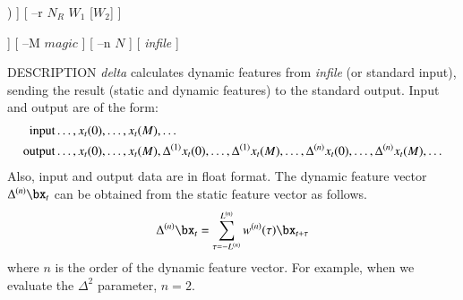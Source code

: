 \begin{synopsis}
	\item [delta] [ --m $M$ ] [ --l $L$ ] [ --t $T$ ] 
		[ --d ($fn$ $|$ $d_0$ [$d_1$ $\dots$]) ]
		[ --r $N_R$ $W_1$ [$W_2$] ]
 \item [\ ~~~~~~~]
 [ --R $N_R$ ${W_F}_{1}$ ${W_B}_{1}$ [${W_F}_{2}$ ${W_B}_{2}$]]
 [ --M $magic$ ] [ --n $N$ ] [ {\em infile} ]
\end{synopsis}

\begin{qsection}{DESCRIPTION}
	{\em delta} calculates dynamic features from {\em infile} (or standard
	input), sending the result (static and dynamic features) to
        the standard output. Input and output are of the form:
    \begin{align}
	\mathrm{input}  & \dots, x_t(0), \dots, x_t(M), \dots \notag \\
	\mathrm{output} & \dots, x_t(0), \dots, x_t(M), \Delta^{(1)} x_t(0), \dots, \Delta^{(1)} x_t(M), \dots,
	\Delta^{(n)} x_t(0), \dots, \Delta^{(n)} x_t(M), \dots \notag
 \end{align}
Also, input and output data are in float format.
The dynamic feature vector $\Delta^{(n)}\bx_t$ can be
obtained from the static feature vector as follows.
 \begin{displaymath}
	\Delta^{(n)}\bx_t 
	= \sum_{\tau=-L^{(n)}}^{L^{(n)}} w^{(n)}(\tau)\bx_{t+\tau}
 \end{displaymath}
where $n$ is the order of the dynamic feature vector. For
example, when we evaluate the $\Delta^2$ parameter, $n=2$.
\end{qsection}

